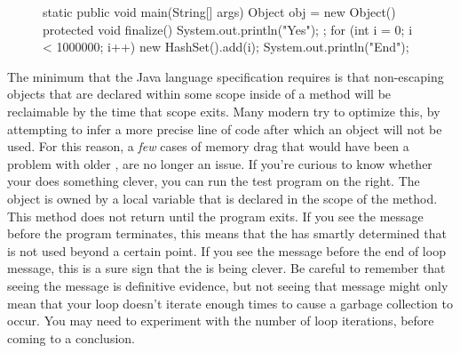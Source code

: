 \begin{figure}
\centering
\begin{framedlisting}
static public void main(String[] args) {
  Object obj = new Object() {
    protected void finalize() {
       System.out.println("Yes");
    }
  };
  for (int i = 0; i < 1000000; i++) {
     new HashSet().add(i);
  }
  System.out.println("End");
}
\end{framedlisting}
\end{figure}
The minimum that the Java language specification requires is that non-escaping
objects that are declared within some scope inside of a method will be
reclaimable by the time that scope exits. Many modern \jres try to optimize
this, by attempting to infer a more precise line of code after which an object
will not be used. For this reason, a \emph{few} cases of memory drag
that would have been a problem with older \jres, are no longer an issue. If
you're curious to know whether your \jre does something clever, you can run the
test program on the right. The  object is owned by a local variable
that is declared in the scope of the  method. This method does not
return until the program exits. 
If you see the message before the program terminates, this means that the \jre
has smartly determined that  is not used beyond a certain point.
If you see the  message before the
end of loop message, this is a sure sign that the \jre is being clever. Be
careful to remember that seeing the message is definitive evidence,
but not seeing that message might only mean that your loop doesn't iterate
enough times to cause a garbage collection to occur. You may need to experiment
with the number of loop iterations, before coming to a conclusion.











